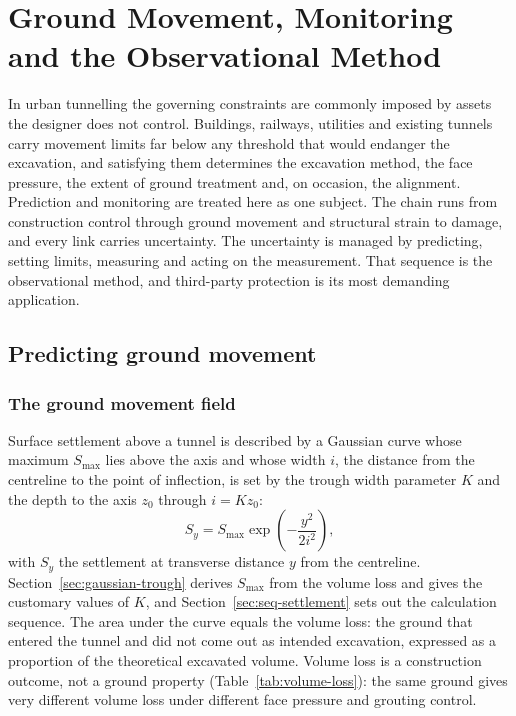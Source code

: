 \chapter{Ground Movement, Monitoring and the Observational Method}
\label{ch:movement-monitoring}
\label{ch:settlement-damage}
\label{ch:monitoring}

In urban tunnelling the governing constraints are commonly imposed by assets
the designer does not control. Buildings, railways, utilities and existing
tunnels carry movement limits far below any threshold that would endanger the
excavation, and satisfying them determines the excavation method, the face
pressure, the extent of ground treatment and, on occasion, the alignment.
Prediction and monitoring are treated here as one subject. The chain runs from
construction control through ground movement and structural strain to damage,
and every link carries uncertainty. The uncertainty is managed by predicting,
setting limits, measuring and acting on the measurement. That sequence
is the observational method, and third-party protection is its most demanding
application.

\section{Predicting ground movement}
\label{sec:predicting-movement}

\subsection{The ground movement field}
\label{sec:movement-field}

Surface settlement above a tunnel is described by a Gaussian curve whose
maximum $S_{\max}$ lies above the axis and whose width $i$, the distance from
the centreline to the point of inflection, is set by the trough width
parameter $K$ and the depth to the axis $z_0$ through $i = K z_0$:
\[
S_y = S_{\max} \exp\!\left(-\frac{y^2}{2i^2}\right),
\]
with $S_y$ the settlement at transverse distance $y$ from the centreline.
Section~\ref{sec:gaussian-trough} derives $S_{\max}$ from the volume loss and
gives the customary values of $K$, and Section~\ref{sec:seq-settlement} sets
out the calculation sequence. The area under the curve equals the volume loss:
the ground that entered the tunnel and did not come out as intended
excavation, expressed as a proportion of the theoretical excavated volume.
Volume loss is a construction outcome, not a ground property (Table~\ref{tab:volume-loss}): the same ground
gives very different volume loss under different face pressure and grouting
control.

